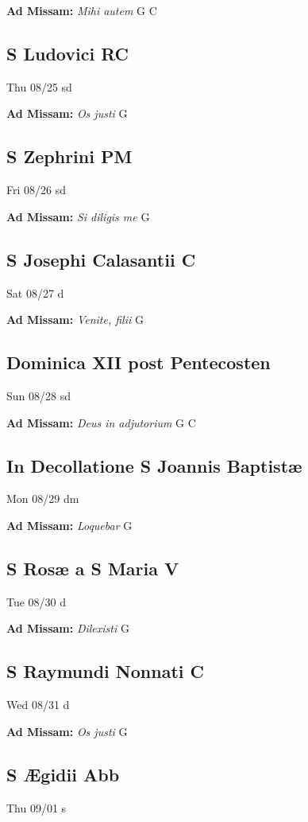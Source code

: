 \documentclass[letterpaper, 10pt, twocolumn]{article}
\begin{document}
\textbf{Ad Missam:} \textit{Mihi autem} G C 

\subsection*{S Ludovici RC}Thu 08/25 sd

\textbf{Ad Missam:} \textit{Os justi} G 

\subsection*{S Zephrini PM}Fri 08/26 sd

\textbf{Ad Missam:} \textit{Si diligis me} G 

\subsection*{S Josephi Calasantii C}Sat 08/27 d

\textbf{Ad Missam:} \textit{Venite, filii} G 

\subsection*{Dominica XII post Pentecosten}Sun 08/28 sd

\textbf{Ad Missam:} \textit{Deus in adjutorium} G C 

\subsection*{In Decollatione S Joannis Baptistæ}Mon 08/29 dm

\textbf{Ad Missam:} \textit{Loquebar} G 

\subsection*{S Rosæ a S Maria V}Tue 08/30 d

\textbf{Ad Missam:} \textit{Dilexisti} G 

\subsection*{S Raymundi Nonnati C}Wed 08/31 d

\textbf{Ad Missam:} \textit{Os justi} G 

\subsection*{S Ægidii Abb}Thu 09/01 s
\end{document}
